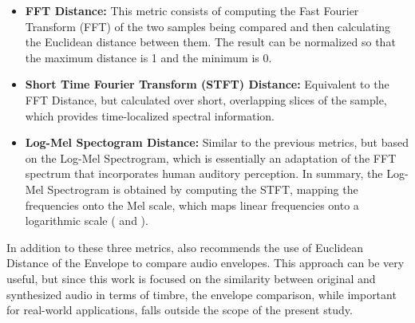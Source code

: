 \documentclass[sigconf,natbib=false]{acmart}
\begin{document}



\begin{itemize}
    \item \textbf{FFT Distance:} This metric consists of computing the Fast Fourier Transform (FFT) of the two samples being compared and then calculating the Euclidean distance between them. The result can be normalized so that the maximum distance is 1 and the minimum is 0.
    \item \textbf{Short Time Fourier Transform (STFT) Distance:} Equivalent to the FFT Distance, but calculated over short, overlapping slices of the sample, which provides time-localized spectral information.
    \item \textbf{Log-Mel Spectogram Distance:} Similar to the previous metrics, but based on the Log-Mel Spectrogram, which is essentially an adaptation of the FFT spectrum that incorporates human auditory perception. In summary, the Log-Mel Spectrogram is obtained by computing the STFT, mapping the frequencies onto the Mel scale, which maps linear frequencies onto a logarithmic scale (\textcite{claesson2021resynthesis} and \textcite{chulev2024improving}).
\end{itemize}

In addition to these three metrics, \textcite{claesson2021resynthesis} also recommends the use of Euclidean Distance of the Envelope to compare audio envelopes. This approach can be very useful, but since this work is focused on the similarity between original and synthesized audio in terms of timbre, the envelope comparison, while important for real-world applications, falls outside the scope of the present study.

\end{document}
